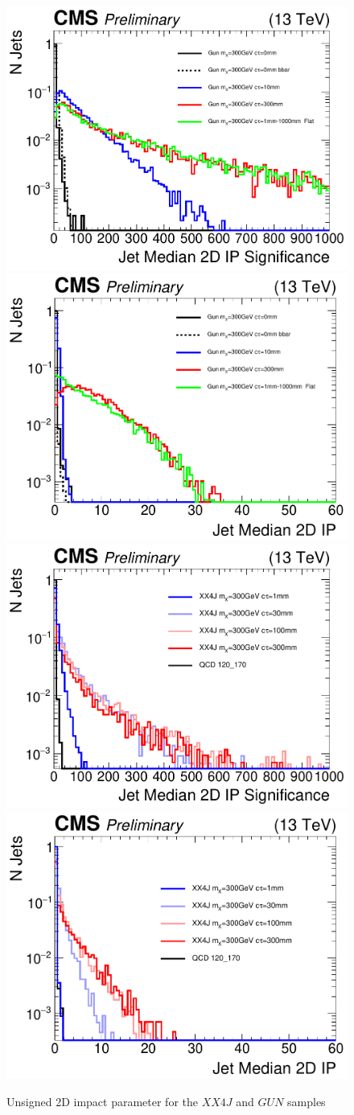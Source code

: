 \begin{figure}
\begin{center}
\includegraphics[width=.45\textwidth]{figures/an_jetid/VTX_MATCH_IP/GUN_jetMedianIPSig2D}
\includegraphics[width=.45\textwidth]{figures/an_jetid/VTX_MATCH_IP/GUN_jetMedianIP2D}
\includegraphics[width=.45\textwidth]{figures/an_jetid/VTX_MATCH_IP/XX4J_jetMedianIPSig2D}
\includegraphics[width=.45\textwidth]{figures/an_jetid/VTX_MATCH_IP/XX4J_jetMedianIP2D}
\end{center}
\caption{Unsigned 2D impact parameter for the $XX4J$ and $GUN$ samples}
\label{fig:ip_vs_ipsig}
\end{figure}


